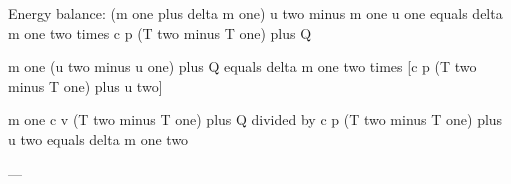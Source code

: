 Energy balance:  
(m one plus delta m one) u two minus m one u one equals delta m one two times c p (T two minus T one) plus Q  

m one (u two minus u one) plus Q equals delta m one two times [c p (T two minus T one) plus u two]  

m one c v (T two minus T one) plus Q divided by c p (T two minus T one) plus u two equals delta m one two  

---